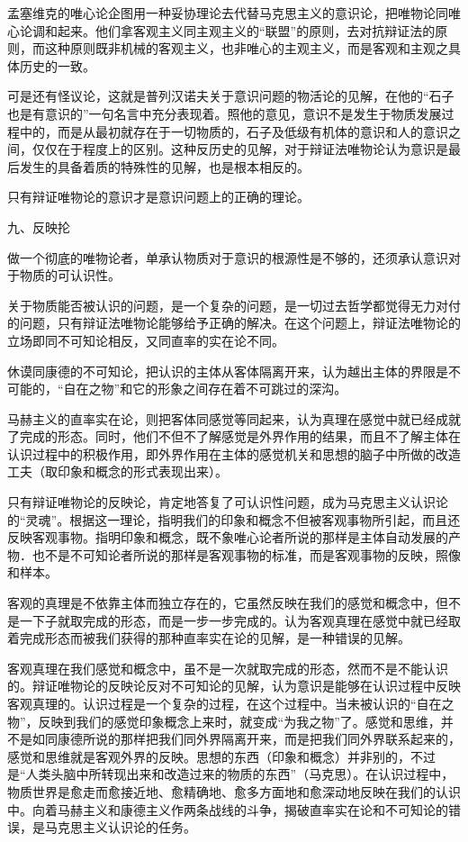 孟塞维克的唯心论企图用一种妥协理论去代替马克思主义的意识论，把唯物论同唯心论调和起来。他们拿客观主义同主观主义的“联盟”的原则，去对抗辩证法的原则，而这种原则既非机械的客观主义，也非唯心的主观主义，而是客观和主观之具体历史的一致。

可是还有怪议论，这就是普列汉诺夫关于意识问题的物活论的见解，在他的“石子也是有意识的”一句名言中充分表现着。照他的意见，意识不是发生于物质发展过程中的，而是从最初就存在于一切物质的，石子及低级有机体的意识和人的意识之间，仅仅在于程度上的区别。这种反历史的见解，对于辩证法唯物论认为意识是最后发生的具备着质的特殊性的见解，也是根本相反的。

只有辩证唯物论的意识才是意识问题上的正确的理论。

九、反映抡

做一个彻底的唯物论者，单承认物质对于意识的根源性是不够的，还须承认意识对于物质的可认识性。

关于物质能否被认识的问题，是一个复杂的问题，是一切过去哲学都觉得无力对付的问题，只有辩证法唯物论能够给予正确的解决。在这个问题上，辩证法唯物论的立场即同不可知论相反，又同直率的实在论不同。

休谟同康德的不可知论，把认识的主体从客体隔离开来，认为越出主体的界限是不可能的，“自在之物”和它的形象之间存在着不可跳过的深沟。

马赫主义的直率实在论，则把客体同感觉等同起来，认为真理在感觉中就已经成就了完成的形态。同时，他们不但不了解感觉是外界作用的结果，而且不了解主体在认识过程中的积极作用，即外界作用在主体的感觉机关和思想的脑子中所做的改造工夫（取印象和概念的形式表现出来）。

只有辩证唯物论的反映论，肯定地答复了可认识性问题，成为马克思主义认识论的“灵魂”。根据这一理论，指明我们的印象和概念不但被客观事物所引起，而且还反映客观事物。指明印象和概念，既不象唯心论者所说的那样是主体自动发展的产物．也不是不可知论者所说的那样是客观事物的标准，而是客观事物的反映，照像和样本。

客观的真理是不依靠主体而独立存在的，它虽然反映在我们的感觉和概念中，但不是一下子就取完成的形态，而是一步一步完成的。认为客观真理在感觉中就已经取着完成形态而被我们获得的那种直率实在论的见解，是一种错误的见解。

客观真理在我们感觉和概念中，虽不是一次就取完成的形态，然而不是不能认识的。辩证唯物论的反映论反对不可知论的见解，认为意识是能够在认识过程中反映客观真理的。认识过程是一个复杂的过程，在这个过程中。当未被认识的“自在之物”，反映到我们的感觉印象概念上来时，就变成“为我之物”了。感觉和思维，并不是如同康德所说的那样把我们同外界隔离开来，而是把我们同外界联系起来的，感觉和思维就是客观外界的反映。思想的东西（印象和概念）并非别的，不过是“人类头脑中所转现出来和改造过来的物质的东西”（马克思）。在认识过程中，物质世界是愈走而愈接近地、愈精确地、愈多方面地和愈深动地反映在我们的认识中。向着马赫主义和康德主义作两条战线的斗争，揭破直率实在论和不可知论的错误，是马克思主义认识论的任务。

